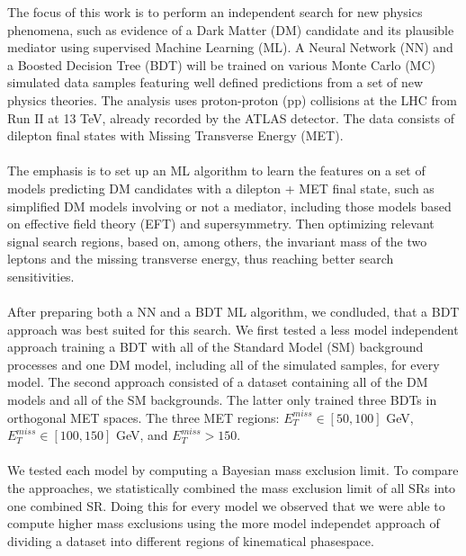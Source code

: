 \documentclass[12pt, a4paper]{book}
\begin{document}
The focus of this work is to perform an independent search for new physics phenomena, such as evidence of a Dark Matter (DM) candidate and its plausible mediator using supervised Machine Learning (ML). A Neural Network (NN) and a Boosted Decision Tree (BDT) will 
be trained on various Monte Carlo (MC) simulated data samples featuring well defined predictions from a set of new physics theories. The analysis uses proton-proton (pp) collisions at the LHC from Run II at 13 TeV, already recorded by the ATLAS detector. 
The data consists of dilepton final states with Missing Transverse Energy (MET).\\
\\The emphasis is to set up an ML algorithm to learn the features on a set of models predicting DM candidates with a dilepton + MET final state, such as simplified DM models 
involving or not a mediator, including those models based on effective field theory (EFT) and supersymmetry. Then optimizing relevant signal search regions, based on, among others, the invariant mass of the two leptons and the missing transverse energy, 
thus reaching better search sensitivities.\\
\\After preparing both a NN and a BDT ML algorithm, we condluded, that a BDT approach was best suited for this search. We first tested a less model independent approach training a BDT with all of the Standard Model (SM) background processes and one DM model, 
including all of the simulated samples, for every model. The second approach consisted of a dataset containing all of the DM models and all of the SM backgrounds. The latter only trained three BDTs in orthogonal MET spaces. The three MET regions: $E_T^{miss}\in[50,100]$ GeV,
$E_T^{miss}\in[100,150]$ GeV, and $E_T^{miss}>150$.\\
\\We tested each model by computing a Bayesian mass exclusion limit. To compare the approaches, we statistically combined the mass exclusion limit of all SRs into one combined SR. Doing this for every model we observed that we were able 
to compute higher mass exclusions using the more model independet approach of dividing a dataset into different regions of kinematical phasespace. 
\end{document}
